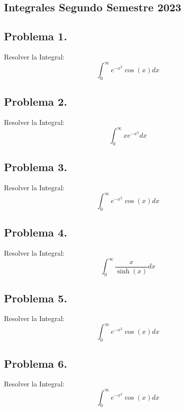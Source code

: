 
\begin{center}
    \section{Integrales Segundo Semestre 2023}

    \begin{CajaTitulo}{\begin{center}\subsection*{Problema 1.}\end{center}}
        Resolver la Integral: \[\int_{0}^{\infty}e^{-x^2}\cos(x)      dx\]
    \end{CajaTitulo} 

    \begin{CajaTitulo}{\begin{center}\subsection*{Problema 2.}\end{center}}
        Resolver la Integral: \[\int_{0}^{\infty}xe^{-x^3}dx\]
    \end{CajaTitulo} 

    \begin{CajaTitulo}{\begin{center}\subsection*{Problema 3.}\end{center}}
        Resolver la Integral: \[\int_{0}^{\infty}e^{-x^2}\cos(x)      dx\]
    \end{CajaTitulo} 
    
    \begin{CajaTitulo}{\begin{center}\subsection*{Problema 4.}\end{center}}
        Resolver la Integral: \[\int_{0}^{\infty}\frac{x}{\sinh(x)}dx\]
    \end{CajaTitulo} 
    
    \begin{CajaTitulo}{\begin{center}\subsection*{Problema 5.}\end{center}}
        Resolver la Integral: \[\int_{0}^{\infty}e^{-x^2}\cos(x)      dx\]
    \end{CajaTitulo} 

    \begin{CajaTitulo}{\begin{center}\subsection*{Problema 6.}\end{center}}
        Resolver la Integral: \[\int_{0}^{\infty}e^{-x^2}\cos(x)      dx\]
    \end{CajaTitulo} 

\end{center}
